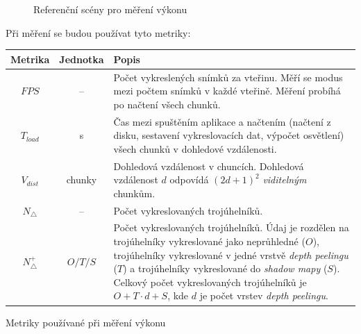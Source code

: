\vfill

\begin{figure}[H]
	\hfill
	
	\hfill
	
	\caption{Referenční scény pro měření výkonu}
\end{figure}

\noindent Při měření se budou používat tyto metriky: \nopagebreak
\begin{tableFloat}[H]
	\def\arraystretch{1.5}
	\centering
	\begin{tabular}{c c L{10cm}}
		\textbf{Metrika} & \textbf{Jednotka} & \textbf{Popis} \\ \hline
		$FPS$ & -- & Počet vykreslených snímků za vteřinu. Měří se modus mezi počtem snímků v každé vteřině. Měření probíhá po načtení všech chunků. \\
		$T_{load}$ & s & Čas mezi spuštěním aplikace a načtením (načtení z disku, sestavení vykreslovacích dat, výpočet osvětlení) všech chunků v dohledové vzdálenosti. \\
		$V_{dist}$ & chunky & Dohledová vzdálenost v chuncích. Dohledová vzdálenost $d$ odpovídá $(2d + 1)^2$ \textit{viditelným} chunkům. \\
		$N_\triangle$ & -- & Počet vykreslovaných trojúhelníků. \\
		$N_\triangle^+$ & $O/T/S$ & Počet vykreslovaných trojúhelníků. Údaj je rozdělen na trojúhelníky vykreslované jako neprůhledné ($O$), trojúhelníky vykreslované v jedné vrstvě \textit{depth peelingu} ($T$) a trojúhelníky vykreslované do \textit{shadow mapy} ($S$). Celkový počet vykreslovaných trojúhelníků je $O + T \cdot d + S$, kde $d$ je počet vrstev \textit{depth peelingu}. \\
	\end{tabular}
	\caption{Metriky používané při měření výkonu}
\end{tableFloat}


